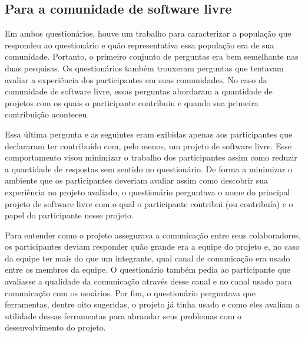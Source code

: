 \subsection{Para a comunidade de software livre}
\label{subsec:floss}

Em ambos questionários, houve um trabalho para caracterizar a
população que respondeu ao questionário e quão representativa essa
população era de sua comunidade. Portanto, o primeiro conjunto de
perguntas era bem semelhante nas duas pesquisas. Os questionários
também trouxeram perguntas que tentavam avaliar a experiência dos
participantes em suas comunidades. No caso da comunidade de software
livre, essas perguntas abordaram a quantidade de projetos com os quais
o participante contribuiu e quando sua primeira contribuição
aconteceu.

Essa última pergunta e as seguintes eram exibidas apenas aos
participantes que declararam ter contribuído com, pelo menos, um
projeto de software livre. Esse comportamento visou minimizar o
trabalho dos participantes assim como reduzir a quantidade de
respostas sem sentido no questionário. De forma a minimizar o ambiente
que os participantes deveriam avaliar assim como descobrir sua
experiência no projeto avaliado, o questionário perguntava o nome do
principal projeto de software livre com o qual o participante
contribui (ou contribuía) e o papel do participante nesse projeto.

Para entender como o projeto assegurava a comunicação entre seus
colaboradores, os participantes deviam responder quão grande era a
equipe do projeto e, no caso da equipe ter mais do que um integrante,
qual canal de comunicação era usado entre os membros da equipe. O
questionário também pedia ao participante que avaliasse a qualidade da
comunicação através desse canal e no canal usado para comunicação com
os usuários.  Por fim, o questionário perguntava que ferramentas,
dentre oito sugeridas, o projeto já tinha usado e como eles avaliam a
utilidade dessas ferramentas para abrandar seus problemas com o
desenvolvimento do projeto.



